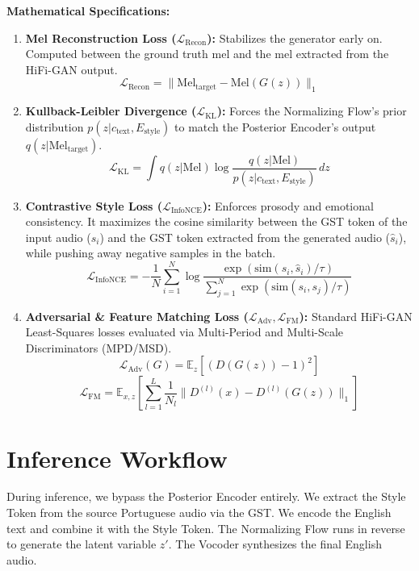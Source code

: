 \documentclass[11pt]{article}
\begin{document}
\textbf{Mathematical Specifications:}
\begin{enumerate}[leftmargin=1.5em]
    \item \textbf{Mel Reconstruction Loss ($\mathcal{L}_{\text{Recon}}$):} Stabilizes the generator early on. Computed between the ground truth mel and the mel extracted from the HiFi-GAN output.
    \[
    \mathcal{L}_{\text{Recon}} = \| \text{Mel}_{\text{target}} - \text{Mel}(G(z)) \|_1
    \]

    \item \textbf{Kullback-Leibler Divergence ($\mathcal{L}_{\text{KL}}$):} Forces the Normalizing Flow's prior distribution $p(z | c_{\text{text}}, E_{\text{style}})$ to match the Posterior Encoder's output $q(z | \text{Mel}_{\text{target}})$.
    \[
    \mathcal{L}_{\text{KL}} = \int q(z | \text{Mel}) \log \frac{q(z | \text{Mel})}{p(z | c_{\text{text}}, E_{\text{style}})} \,dz
    \]

    \item \textbf{Contrastive Style Loss ($\mathcal{L}_{\text{InfoNCE}}$):} Enforces prosody and emotional consistency. It maximizes the cosine similarity between the GST token of the input audio ($s_i$) and the GST token extracted from the generated audio ($\hat{s}_i$), while pushing away negative samples in the batch.
    \[
    \mathcal{L}_{\text{InfoNCE}} = - \frac{1}{N} \sum_{i=1}^{N} \log \frac{\exp(\text{sim}(s_i, \hat{s}_i) / \tau)}{\sum_{j=1}^{N} \exp(\text{sim}(s_i, s_j) / \tau)}
    \]

    \item \textbf{Adversarial \& Feature Matching Loss ($\mathcal{L}_{\text{Adv}}, \mathcal{L}_{\text{FM}}$):} Standard HiFi-GAN Least-Squares losses evaluated via Multi-Period and Multi-Scale Discriminators (MPD/MSD).
    \[
    \mathcal{L}_{\text{Adv}}(G) = \mathbb{E}_z \left[ (D(G(z)) - 1)^2 \right]
    \]
    \[
    \mathcal{L}_{\text{FM}} = \mathbb{E}_{x, z} \left[ \sum_{l=1}^{L} \frac{1}{N_l} \| D^{(l)}(x) - D^{(l)}(G(z)) \|_1 \right]
    \]
\end{enumerate}

\section{Inference Workflow}

\begin{sloppypar}
During inference, we bypass the Posterior Encoder entirely.
We extract the Style Token from the source Portuguese audio via the GST.
We encode the English text and combine it with the Style Token.
The Normalizing Flow runs in reverse to generate the latent variable $z'$.
The Vocoder synthesizes the final English audio.
\end{sloppypar}
\end{document}
